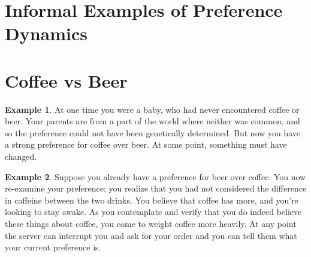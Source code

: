 \documentclass{article}
\theoremstyle{plain}
\theoremstyle{definition}
\newtheorem{example}{Example}[section]
\theoremstyle{remark}
\begin{document}
	\section{Informal Examples of Preference Dynamics}
%	


	\section{Coffee vs Beer}
	\begin{example}
		At one time you were a baby, who had never encountered coffee or beer. Your parents are from a part of the world where neither was common, and so the preference could not have been genetically determined. But now you have a strong preference for coffee over beer. At some point, something must have changed.
	\end{example}
	
	\begin{example}
		Suppose you already have a preference for beer over coffee. You now re-examine your preference; you realize that you had not considered the difference in caffeine between the two drinks. You believe that coffee has more, and you're looking to stay awake. As you contemplate and verify that you do indeed believe these things about coffee, you come to weight coffee more heavily. At any point the server can interrupt you and ask for your order and you can tell them what your current preference is.
	\end{example}
\end{document}
